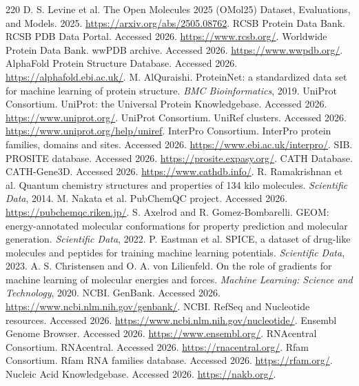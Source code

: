 \documentclass[11pt]{article}
\newcommand{\1}{\mathbf{1}}
\begin{document}
\begin{thebibliography}{220}
 D. S. Levine et al. The Open Molecules 2025 (OMol25) Dataset, Evaluations, and Models. 2025. \url{https://arxiv.org/abs/2505.08762}.
 RCSB Protein Data Bank. RCSB PDB Data Portal. Accessed 2026. \url{https://www.rcsb.org/}.
 Worldwide Protein Data Bank. wwPDB archive. Accessed 2026. \url{https://www.wwpdb.org/}.
 AlphaFold Protein Structure Database. Accessed 2026. \url{https://alphafold.ebi.ac.uk/}.
 M. AlQuraishi. ProteinNet: a standardized data set for machine learning of protein structure. \emph{BMC Bioinformatics}, 2019.
 UniProt Consortium. UniProt: the Universal Protein Knowledgebase. Accessed 2026. \url{https://www.uniprot.org/}.
 UniProt Consortium. UniRef clusters. Accessed 2026. \url{https://www.uniprot.org/help/uniref}.
 InterPro Consortium. InterPro protein families, domains and sites. Accessed 2026. \url{https://www.ebi.ac.uk/interpro/}.
 SIB. PROSITE database. Accessed 2026. \url{https://prosite.expasy.org/}.
 CATH Database. CATH-Gene3D. Accessed 2026. \url{https://www.cathdb.info/}.
 R. Ramakrishnan et al. Quantum chemistry structures and properties of 134 kilo molecules. \emph{Scientific Data}, 2014.
 M. Nakata et al. PubChemQC project. Accessed 2026. \url{https://pubchemqc.riken.jp/}.
 S. Axelrod and R. Gomez-Bombarelli. GEOM: energy-annotated molecular conformations for property prediction and molecular generation. \emph{Scientific Data}, 2022.
 P. Eastman et al. SPICE, a dataset of drug-like molecules and peptides for training machine learning potentials. \emph{Scientific Data}, 2023.
 A. S. Christensen and O. A. von Lilienfeld. On the role of gradients for machine learning of molecular energies and forces. \emph{Machine Learning: Science and Technology}, 2020.
 NCBI. GenBank. Accessed 2026. \url{https://www.ncbi.nlm.nih.gov/genbank/}.
 NCBI. RefSeq and Nucleotide resources. Accessed 2026. \url{https://www.ncbi.nlm.nih.gov/nucleotide/}.
 Ensembl Genome Browser. Accessed 2026. \url{https://www.ensembl.org/}.
 RNAcentral Consortium. RNAcentral. Accessed 2026. \url{https://rnacentral.org/}.
 Rfam Consortium. Rfam RNA families database. Accessed 2026. \url{https://rfam.org/}.
 Nucleic Acid Knowledgebase. Accessed 2026. \url{https://nakb.org/}.

\end{thebibliography}
\end{document}
